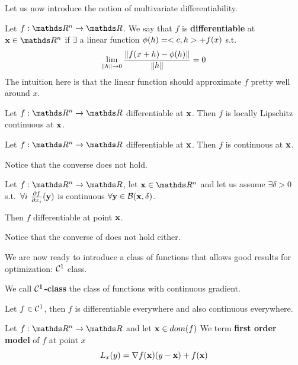 \documentclass[computationalMathematics.tex]{subfiles}
\begin{document}
Let us now introduce the notion of multivariate differentiability.

\begin{definition}[Differentiable]
Let $f: \R^n \to \R$. We say that $f$ is \textbf{differentiable} at $\vect{x} \in \R^n$ if $\exists$ a linear function $\phi(h) = <c, h> + f(x)$ s.t.
  \[
    \lim_{\left\lVert h\right\rVert \to 0} \frac{\left\lVert f(x + h) - \phi(h)\right\rVert}{\left\lVert h\right\rVert}= 0
  \]
  The intuition here is that the linear function should approximate $f$ pretty well around $x$.
\end{definition}



\begin{proposition}
Let $f : \R^n \to \R$ differentiable at ${\bf x }$. Then $f$ is locally Lipschitz continuous at ${\bf x }$.
\end{proposition}

\begin{corollary}
Let $f : \R^n \to \R$ differentiable at ${\bf x }$. Then $f$ is continuous at ${\bf x }$.
\end{corollary}

\noindent Notice that the converse does not hold.

\begin{proposition}\label{prop:27set1}
Let $f : \R^n \to \R$, let $\vect{x} \in \R^n$ and let us assume $\exists \delta > 0$ s.t.~$\forall i~\frac{\partial f}{\partial x_i}({\bf y })$ is continuous $\forall {\bf y } \in \mathcal{B}({\bf x }, \delta)$.

Then $f$ differentiable at point ${\bf x }$.
\end{proposition}

\noindent Notice that the converse of  does not hold either.

We are now ready to introduce a class of functions that allows good results for optimization: $\C{1}$ class.

\begin{definition}[$\C{1}$ class]
	We call $\bf {\mathcal{C}}^{1}$\textbf{-class} the class of functions with continuous gradient.
\end{definition}

\begin{proposition}
Let $f \in {\mathcal{C}}^{1}$, then $f$ is differentiable everywhere and also continuous everywhere.
\end{proposition}

\begin{definition}
	Let $f: \R^n \to \R$ and let ${\bf x } \in dom(f)$ We term \textbf{first order model} of $f$ at point $x$ 
	\[
	L_x(y) = \nabla f({\bf x }) (y - {\bf x }) + f({\bf x })
	\]
\end{definition}
\end{document}
